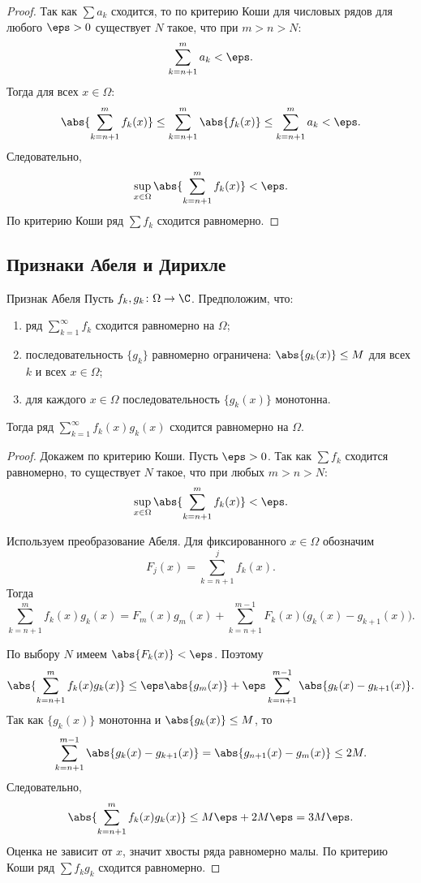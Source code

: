 \begin{proof}
	Так как $\sum a_k$ сходится, то по критерию Коши для числовых рядов для любого $\eps>0$ существует $N$ такое, что при $m>n>N$:
	\[
	\sum_{k=n+1}^{m}a_k<\eps.
	\]
	Тогда для всех $x\in\Omega$:
	\[
	\abs{\sum_{k=n+1}^{m}f_k(x)}
	\le
	\sum_{k=n+1}^{m}\abs{f_k(x)}
	\le
	\sum_{k=n+1}^{m}a_k
	<\eps.
	\]
	Следовательно,
	\[
	\sup_{x\in\Omega}
	\abs{\sum_{k=n+1}^{m}f_k(x)}
	<\eps.
	\]
	По критерию Коши ряд $\sum f_k$ сходится равномерно.
\end{proof}

\subsection{Признаки Абеля и Дирихле}

\begin{Theorem}{Признак Абеля}{}
	Пусть $f_k,g_k\colon\Omega\to\C$. Предположим, что:
	
	\begin{enumerate}
		\item ряд $\sum_{k=1}^{\infty}f_k$ сходится равномерно на $\Omega$;
		\item последовательность $\{g_k\}$ равномерно ограничена: $\abs{g_k(x)}\le M$ для всех $k$ и всех $x\in\Omega$;
		\item для каждого $x\in\Omega$ последовательность $\{g_k(x)\}$ монотонна.
	\end{enumerate}
	
	Тогда ряд $\sum_{k=1}^{\infty}f_k(x)g_k(x)$ сходится равномерно на $\Omega$.
\end{Theorem}

\begin{proof}
	Докажем по критерию Коши. Пусть $\eps>0$. Так как $\sum f_k$ сходится равномерно, то существует $N$ такое, что при любых $m>n>N$:
	\[
	\sup_{x\in\Omega}
	\abs{\sum_{k=n+1}^{m}f_k(x)}
	<\eps.
	\]
	
	Используем преобразование Абеля. Для фиксированного $x\in\Omega$ обозначим
	\[
	F_j(x)=\sum_{k=n+1}^{j}f_k(x).
	\]
	Тогда
	\[
	\sum_{k=n+1}^{m}f_k(x)g_k(x)
	=
	F_m(x)g_m(x)
	+
	\sum_{k=n+1}^{m-1}F_k(x)\bigl(g_k(x)-g_{k+1}(x)\bigr).
	\]
	
	По выбору $N$ имеем $\abs{F_k(x)}<\eps$. Поэтому
	\[
	\abs{\sum_{k=n+1}^{m}f_k(x)g_k(x)}
	\le
	\eps\abs{g_m(x)}
	+
	\eps\sum_{k=n+1}^{m-1}\abs{g_k(x)-g_{k+1}(x)}.
	\]
	Так как $\{g_k(x)\}$ монотонна и $\abs{g_k(x)}\le M$, то
	\[
	\sum_{k=n+1}^{m-1}\abs{g_k(x)-g_{k+1}(x)}
	=
	\abs{g_{n+1}(x)-g_m(x)}
	\le 2M.
	\]
	Следовательно,
	\[
	\abs{\sum_{k=n+1}^{m}f_k(x)g_k(x)}
	\le
	M\eps+2M\eps
	=
	3M\eps.
	\]
	Оценка не зависит от $x$, значит хвосты ряда равномерно малы. По критерию Коши ряд $\sum f_kg_k$ сходится равномерно.
\end{proof}

